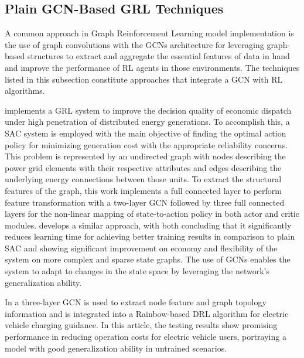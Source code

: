 \subsection{Plain GCN-Based GRL Techniques}

A common approach in Graph Reinforcement Learning model implementation is the use of graph convolutions with the \acp{GCN} architecture for leveraging graph-based structures to extract and aggregate the essential features of data in hand and improve the performance of \ac{RL} agents in those environments. The techniques listed in this subsection constitute approaches that integrate a \ac{GCN} with \ac{RL} algorithms.\par
\cite{liNovelGraphReinforcement2022} implements a \ac{GRL} system to improve the decision quality of economic dispatch under high penetration of distributed energy generations. To accomplish this, a \ac{SAC} system is employed with the main objective of finding the optimal action policy for minimizing generation cost with the appropriate reliability concerns. This problem is represented by an undirected graph with nodes describing the power grid elements with their respective attributes and edges describing the underlying energy connections between those units. To extract the structural features of the graph, this work implements a full connected layer to perform feature transformation with a two-layer \ac{GCN} followed by three full connected layers for the non-linear mapping of state-to-action policy in both actor and critic modules. \cite{chenScalableGraphReinforcement2023} develops a similar approach, with both concluding that it significantly reduces learning time for achieving better training results in comparison to plain \ac{SAC} and showing significant improvement on economy and flexibility of the system on more complex and sparse state graphs. The use of \acp{GCN} enables the system to adapt to changes in the state space by leveraging the network's generalization ability.\par
In \cite{xingGraphReinforcementLearningBased2023} a three-layer \ac{GCN} is used to extract node feature and graph topology information and is integrated into a Rainbow-based \cite{hesselRainbowCombiningImprovements2018} \ac{DRL} algorithm for electric vehicle charging guidance. In this article, the testing results show promising performance in reducing operation costs for electric vehicle users, portraying a model with good generalization ability in untrained scenarios. \par

